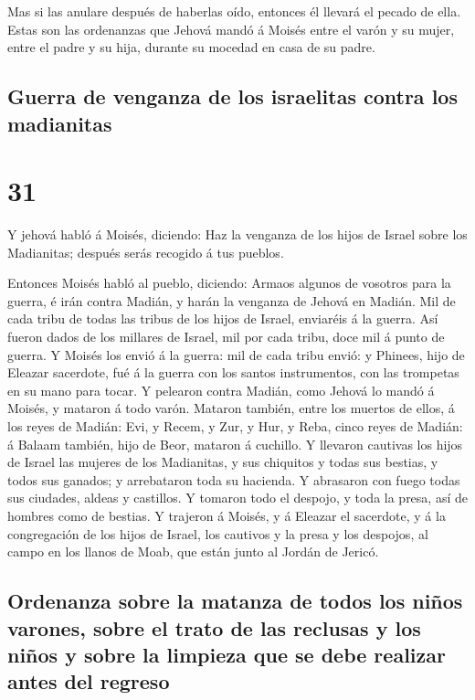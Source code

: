  Mas si las anulare después de haberlas oído, entonces él
llevará el pecado de ella. Estas son las ordenanzas que Jehová mandó á
Moisés entre el varón y su mujer, entre el padre y su hija, durante su
mocedad en casa de su padre.

\hypertarget{guerra-de-venganza-de-los-israelitas-contra-los-madianitas}{%
\subsection{Guerra de venganza de los israelitas contra los
madianitas}\label{guerra-de-venganza-de-los-israelitas-contra-los-madianitas}}

\hypertarget{section-30}{%
\section{31}\label{section-30}}

 Y jehová habló á Moisés, diciendo:  Haz la
venganza de los hijos de Israel sobre los Madianitas; después serás
recogido á tus pueblos.

 Entonces Moisés habló al pueblo, diciendo: Armaos algunos
de vosotros para la guerra, é irán contra Madián, y harán la venganza de
Jehová en Madián.  Mil de cada tribu de todas las tribus de
los hijos de Israel, enviaréis á la guerra.  Así fueron
dados de los millares de Israel, mil por cada tribu, doce mil á punto de
guerra.  Y Moisés los envió á la guerra: mil de cada tribu
envió: y Phinees, hijo de Eleazar sacerdote, fué á la guerra con los
santos instrumentos, con las trompetas en su mano para tocar.
 Y pelearon contra Madián, como Jehová lo mandó á Moisés, y
mataron á todo varón.  Mataron también, entre los muertos de
ellos, á los reyes de Madián: Evi, y Recem, y Zur, y Hur, y Reba, cinco
reyes de Madián: á Balaam también, hijo de Beor, mataron á cuchillo.
 Y llevaron cautivas los hijos de Israel las mujeres de los
Madianitas, y sus chiquitos y todas sus bestias, y todos sus ganados; y
arrebataron toda su hacienda.  Y abrasaron con fuego todas
sus ciudades, aldeas y castillos.  Y tomaron todo el
despojo, y toda la presa, así de hombres como de bestias. 
Y trajeron á Moisés, y á Eleazar el sacerdote, y á la congregación de
los hijos de Israel, los cautivos y la presa y los despojos, al campo en
los llanos de Moab, que están junto al Jordán de Jericó.

\hypertarget{ordenanza-sobre-la-matanza-de-todos-los-niuxf1os-varones-sobre-el-trato-de-las-reclusas-y-los-niuxf1os-y-sobre-la-limpieza-que-se-debe-realizar-antes-del-regreso}{%
\subsection{Ordenanza sobre la matanza de todos los niños varones, sobre
el trato de las reclusas y los niños y sobre la limpieza que se debe
realizar antes del
regreso}\label{ordenanza-sobre-la-matanza-de-todos-los-niuxf1os-varones-sobre-el-trato-de-las-reclusas-y-los-niuxf1os-y-sobre-la-limpieza-que-se-debe-realizar-antes-del-regreso}}

